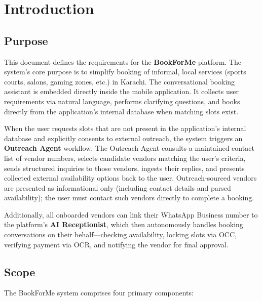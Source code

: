 
\section{Introduction}

\subsection{Purpose}
This document defines the requirements for the \textbf{BookForMe} platform.  The
system's core purpose is to simplify booking of informal, local services (sports
courts, salons, gaming zones, etc.) in Karachi.  The conversational booking assistant
is embedded directly inside the mobile application.  It collects user requirements
via natural language, performs clarifying questions, and books directly from the
application's internal database when matching slots exist.

When the user requests slots that are not present in the application's internal
database and explicitly consents to external outreach, the system triggers an
\textbf{Outreach Agent} workflow.  The Outreach Agent consults a maintained contact
list of vendor numbers, selects candidate vendors matching the user's criteria,
sends structured inquiries to those vendors, ingests their replies, and presents
collected external availability options back to the user.  Outreach-sourced vendors
are presented as informational only (including contact details and parsed
availability); the user must contact such vendors directly to complete a booking.

Additionally, all onboarded vendors can link their WhatsApp Business number to the
platform's \textbf{AI Receptionist}, which then autonomously handles booking
conversations on their behalf---checking availability, locking slots via OCC, verifying
payment via OCR, and notifying the vendor for final approval.

\subsection{Scope}
The BookForMe system comprises four primary components:

